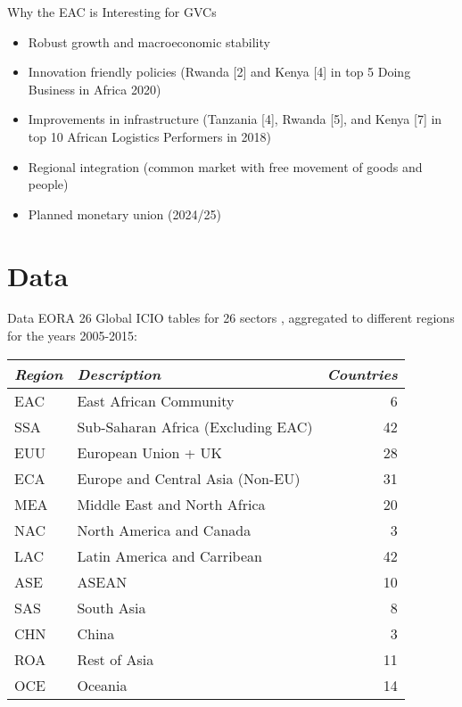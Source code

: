 \documentclass[compress]{beamer}
\newenvironment{noheadline}{
    \setbeamertemplate{headline}{}
    \addtobeamertemplate{frametitle}{\vspace*{-0.9\baselineskip}}{}
}{}
\begin{document}
\begin{noheadline}
\begin{frame}{Why the EAC is Interesting for GVCs}
\begin{itemize}
\item Robust growth and macroeconomic stability
\item Innovation friendly policies (Rwanda [2] and Kenya [4] in top 5 Doing Business in Africa 2020)
\item Improvements in infrastructure (Tanzania [4], Rwanda [5], and Kenya [7] in top 10 African Logistics Performers in 2018) 
\item Regional integration (common market with free movement of goods and people)
\item Planned monetary union (2024/25)
\end{itemize}
\end{frame}


\section{Data}


\begin{frame}{Data}
EORA 26 Global ICIO tables for 26 sectors \citet{lenzen2012mapping, lenzen2013building}, aggregated to different regions for the years 2005-2015:

\begin{table}[h!]
\centering
\label{tab:ctry}
\begin{tabular}{llr} \toprule
\textit{Region} & \textit{Description} & \textit{Countries} \\ \midrule
EAC & East African Community & 6 \\
SSA & Sub-Saharan Africa (Excluding EAC) & 42 \\
EUU & European Union + UK & 28 \\
ECA & Europe and Central Asia (Non-EU) & 31 \\
MEA & Middle East and North Africa & 20 \\
NAC & North America and Canada & 3\\
LAC & Latin America and Carribean & 42 \\
ASE & ASEAN & 10 \\
SAS & South Asia & 8 \\
CHN & China & 3 \\
ROA & Rest of Asia & 11 \\
OCE & Oceania & 14
 \\ \bottomrule
\end{tabular}
\end{table}
\end{frame}


\end{noheadline}
\end{document}
